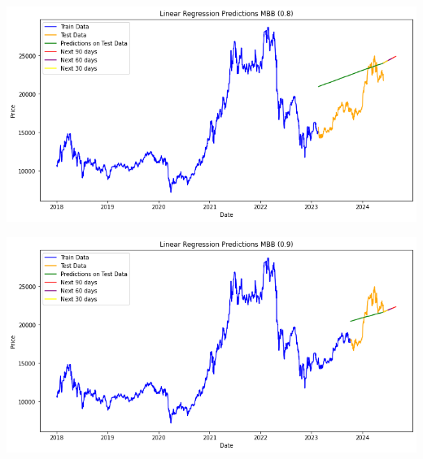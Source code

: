 \documentclass[conference]{IEEEtran}
\begin{document}
\begin{minipage}{0.21\textwidth}
    \centering
    \includegraphics[width=\linewidth]{images/LR/LR_MBB_82.png}
    \label{fig:image1}
\end{minipage}
\hfill
\begin{minipage}{0.21\textwidth}
    \centering
    \includegraphics[width=\linewidth]{images/LR/LR_MBB_91.png}
    \label{fig:image2}
\end{minipage}
\end{document}
